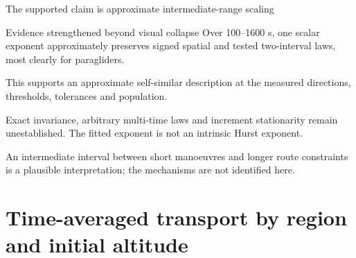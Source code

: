 \documentclass[11pt,aspectratio=169]{beamer}
\begin{document}
\begin{frame}{The supported claim is approximate intermediate-range scaling}
\begin{block}{Evidence strengthened beyond visual collapse}
Over 100--1600 s, one scalar exponent approximately preserves signed spatial
and tested two-interval laws, most clearly for paragliders.
\end{block}
\small
This supports an approximate self-similar description at the measured
directions, thresholds, tolerances and population.
\par\medskip
Exact invariance, arbitrary multi-time laws and increment stationarity remain
unestablished. The fitted exponent is not an intrinsic Hurst exponent.
\par\medskip
An intermediate interval between short manoeuvres and longer route constraints
is a plausible interpretation; the mechanisms are not identified here.
\end{frame}

\section{Time-averaged transport by region and initial altitude}
\end{document}
